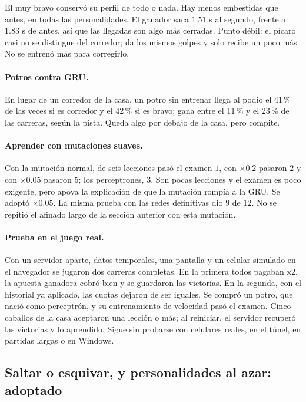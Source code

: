 \documentclass[11pt,letterpaper]{article}
\begin{document}
El muy bravo conservó su perfil de todo o nada. Hay menos embestidas que antes, en todas las personalidades. El ganador saca $1.51$ s al segundo, frente a $1.83$ s de antes, así que las llegadas son algo más cerradas. Punto débil: el pícaro casi no se distingue del corredor; da los mismos golpes y solo recibe un poco más. No se entrenó más para corregirlo.

\paragraph{Potros contra GRU.} En lugar de un corredor de la casa, un potro sin entrenar llega al podio el 41\,\% de las veces si es corredor y el 42\,\% si es bravo; gana entre el 11\,\% y el 23\,\% de las carreras, según la pista. Queda algo por debajo de la casa, pero compite.

\paragraph{Aprender con mutaciones suaves.} Con la mutación normal, de seis lecciones pasó el examen $1$, con $\times 0.2$ pasaron $2$ y con $\times 0.05$ pasaron $5$; los perceptrones, $3$. Son pocas lecciones y el examen es poco exigente, pero apoya la explicación de que la mutación rompía a la GRU. Se adoptó $\times 0.05$. La misma prueba con las redes definitivas dio $9$ de $12$. No se repitió el afinado largo de la sección anterior con esta mutación.

\paragraph{Prueba en el juego real.} Con un servidor aparte, datos temporales, una pantalla y un celular simulado en el navegador se jugaron dos carreras completas. En la primera todos pagaban x2, la apuesta ganadora cobró bien y se guardaron las victorias. En la segunda, con el historial ya aplicado, las cuotas dejaron de ser iguales. Se compró un potro, que nació como perceptrón, y su entrenamiento de velocidad pasó el examen. Cinco caballos de la casa aceptaron una lección o más; al reiniciar, el servidor recuperó las victorias y lo aprendido. Sigue sin probarse con celulares reales, en el túnel, en partidas largas o en Windows.

\subsection{Saltar o esquivar, y personalidades al azar: adoptado}
\end{document}
